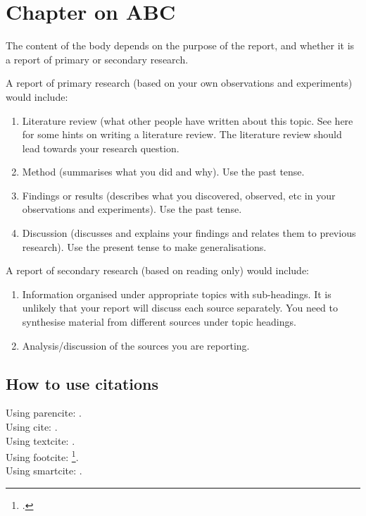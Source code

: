 \chapter{Chapter on ABC}
The content of the body depends on the purpose of the report, and whether it is a report of primary or secondary research.

A report of primary research (based on your own observations and experiments) would include:
\begin{enumerate}
\item
Literature review (what other people have written about this topic. See here for some hints on writing a literature review. The literature review should lead towards your research question.
\item
Method (summarises what you did and why). Use the past tense.
\item
Findings or results (describes what you discovered, observed, etc in your observations and experiments). Use the past tense.
\item
Discussion (discusses and explains your findings and relates them to previous research). Use the present tense to make generalisations.
\end{enumerate}
A report of secondary research (based on reading only) would include:
\begin{enumerate}
\item
Information organised under appropriate topics with sub-headings. It is unlikely that your report will discuss each source separately. You need to synthesise material from different sources under topic headings.
\item
Analysis/discussion of the sources you are reporting.
\end{enumerate}
\section{How to use citations}

Using parencite: \parencite{RN4}.\\

Using cite: \cite[prenote][postnote]{RN4}.\\

Using textcite: \textcite{RN4}.\\

Using footcite: \footcite[prenote][postnote]{RN4}.\\

Using smartcite: \smartcite{RN4}.\\
 

